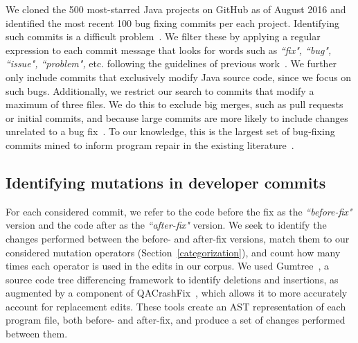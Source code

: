 \documentclass[conference]{IEEEtran}
\begin{document}
We cloned the 500 most-starred Java projects on GitHub 
as of August 2016 and
identified the most recent 100 bug fixing commits per each project. Identifying
such commits is a difficult
problem~\cite{Bird09}. We filter these by applying a
regular expression to each commit message that looks for words such as \emph{``fix", ``bug", ``issue", ``problem",}
etc. following the guidelines of previous work~\cite{schroter06}.
%
We further only include commits
that exclusively 
modify Java source code, since we focus on such bugs. Additionally, we restrict our search to commits 
that modify a maximum of three files. We do this to exclude
big merges, such as pull requests or initial commits, and because
large commits are more likely to include changes unrelated to a bug fix~\cite{Herzig13,Kawrykow11}.
To our knowledge, this is the largest set of bug-fixing commits mined to inform
program repair in the existing literature~\cite{long16proph,Soto16,zhong15,martinez15,xuan16}. 

\subsection{Identifying mutations in developer commits}
\label{sec:mining}

For each considered commit, we refer to the code before the fix as the
\emph{``before-fix"} version and the code after as the \emph{``after-fix"} version.
We seek to identify the changes performed between the before- and
after-fix versions, match them to our considered mutation operators
(Section~\ref{categorization}), and count how many times each operator is used
in the edits in our corpus. 
We used Gumtree~\cite{falleri14}, a source code tree
differencing framework to identify deletions and insertions, as augmented by a
component of QACrashFix~\cite{gao15}, which allows it to more accurately account for
replacement edits. 
These tools create an AST representation of each program file, both before- and after-fix, and produce a set of 
changes performed between them. 
\end{document}
